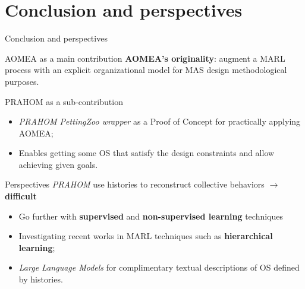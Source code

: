 \section{Conclusion and perspectives}
\begin{frame}{Conclusion and perspectives}
    {}

    \begin{prosblock}{AOMEA as a main contribution}
        \textbf{AOMEA's originality}: augment a MARL process with an explicit organizational model for MAS design methodological purposes.
    \end{prosblock}

    \begin{prosblock}{PRAHOM as a sub-contribution}

        \begin{itemize}
            \item \emph{PRAHOM PettingZoo wrapper} as a Proof of Concept for practically applying AOMEA;
            \item Enables getting some OS that satisfy the design constraints and allow achieving given goals.
        \end{itemize}

    \end{prosblock}

    \begin{alertblock}{Perspectives}
        \emph{PRAHOM} use histories to reconstruct collective behaviors $\rightarrow$ \textbf{difficult}
        \begin{itemize}
            \item Go further with \textbf{supervised} and \textbf{non-supervised learning} techniques
            \item Investigating recent works in MARL techniques such as \textbf{hierarchical learning};
            \item \emph{Large Language Models} for complimentary textual descriptions of OS defined by histories.
        \end{itemize}
    \end{alertblock}

\end{frame}
